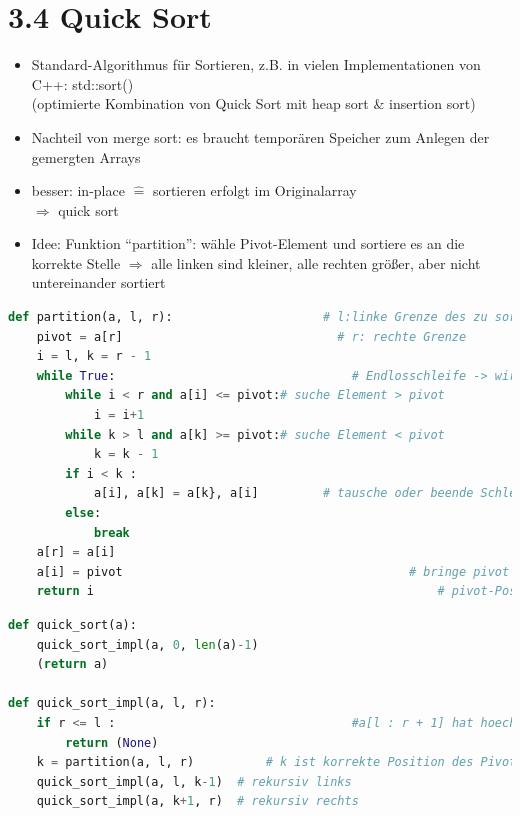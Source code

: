 \documentclass[11pt, fleqn]{scrreprt}
\begin{document}
	\section*{3.4 Quick Sort}
	
	\begin{itemize}
		\item Standard-Algorithmus für Sortieren, z.B. in vielen Implementationen von C++:  std::sort() \\
		(optimierte Kombination von Quick Sort mit heap sort \& insertion sort)
		\item Nachteil von merge sort: es braucht temporären Speicher zum Anlegen der gemergten Arrays
		\item besser: in-place $\widehat{=}$ sortieren erfolgt im Originalarray \\
		$\Rightarrow$ quick sort
		\item Idee: Funktion ``partition'': wähle Pivot-Element und sortiere es an die korrekte Stelle $\Rightarrow$ alle linken sind kleiner, alle rechten größer, aber nicht untereinander sortiert
	\end{itemize}
	
	\begin{lstlisting}[language=Python]
def partition(a, l, r): 					# l:linke Grenze des zu sortierenden Bereichs
	pivot = a[r]       					 	  # r: rechte Grenze 
	i = l, k = r - 1
	while True:         						# Endlosschleife -> wird unten per "break" verlassen
		while i < r and a[i] <= pivot:# suche Element > pivot
			i = i+1
		while k > l and a[k] >= pivot:# suche Element < pivot
			k = k - 1
		if i < k :
			a[i], a[k] = a[k}, a[i] 		# tausche oder beende Schleife
		else:
			break
	a[r] = a[i]
	a[i] = pivot 										# bringe pivot an richtige Pos.
	return i 												# pivot-Position fuer Rekursion
	\end{lstlisting}
	
	\begin{lstlisting}[language=Python]
def quick_sort(a):
	quick_sort_impl(a, 0, len(a)-1)
	(return a)
	
def quick_sort_impl(a, l, r):
	if r <= l : 								#a[l : r + 1] hat hoechstens ein Element -> schon sortiert
		return (None)
	k = partition(a, l, r)  		# k ist korrekte Position des Pivot
	quick_sort_impl(a, l, k-1)  # rekursiv links
	quick_sort_impl(a, k+1, r)  # rekursiv rechts
	\end{lstlisting}
	
\end{document}
